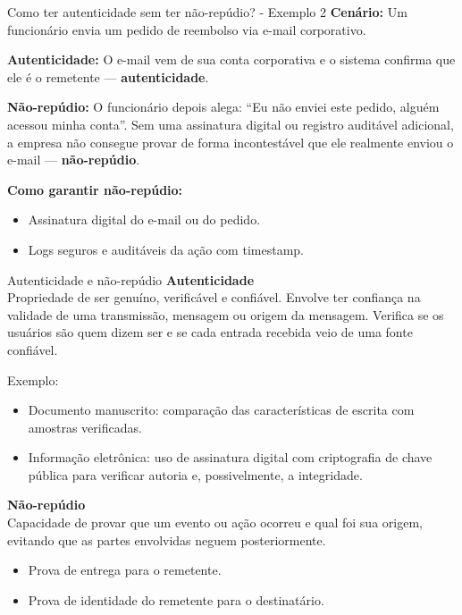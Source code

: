 \begin{frame}{Como ter autenticidade sem ter não-repúdio? - Exemplo 2}
\textbf{Cenário:} Um funcionário envia um pedido de reembolso via e-mail corporativo.

\medskip
\textbf{Autenticidade:}  
O e-mail vem de sua conta corporativa e o sistema confirma que ele é o remetente — \textbf{autenticidade}.

\medskip
\textbf{Não-repúdio:}  
O funcionário depois alega: ``Eu não enviei este pedido, alguém acessou minha conta''.  
Sem uma assinatura digital ou registro auditável adicional, a empresa não consegue provar de forma incontestável que ele realmente enviou o e-mail — \textbf{não-repúdio}.

\medskip
\textbf{Como garantir não-repúdio:}
\begin{itemize}
    \item Assinatura digital do e-mail ou do pedido.
    \item Logs seguros e auditáveis da ação com timestamp.
\end{itemize}
\end{frame}


\begin{frame}{Autenticidade e não-repúdio}
\textbf{Autenticidade} \\
Propriedade de ser genuíno, verificável e confiável. Envolve ter confiança na validade de uma transmissão, mensagem ou origem da mensagem.  
Verifica se os usuários são quem dizem ser e se cada entrada recebida veio de uma fonte confiável.

\medskip
Exemplo:  
\begin{itemize}
    \item Documento manuscrito: comparação das características de escrita com amostras verificadas.
    \item Informação eletrônica: uso de assinatura digital com criptografia de chave pública para verificar autoria e, possivelmente, a integridade.
\end{itemize}

\medskip
\textbf{Não-repúdio} \\
Capacidade de provar que um evento ou ação ocorreu e qual foi sua origem, evitando que as partes envolvidas neguem posteriormente.  
\begin{itemize}
    \item Prova de entrega para o remetente.
    \item Prova de identidade do remetente para o destinatário.
\end{itemize}
\end{frame}

